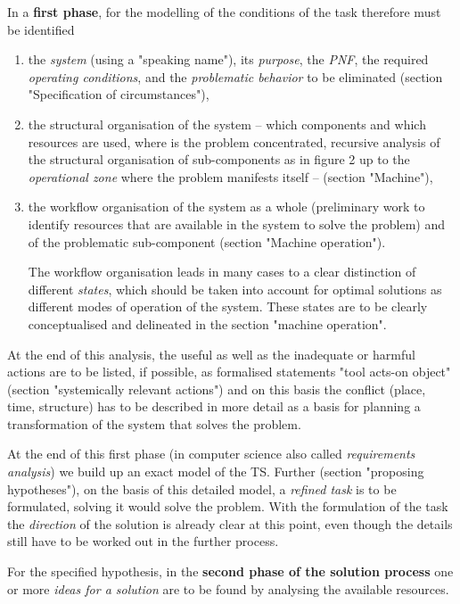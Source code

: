 \documentclass[11pt,a4paper]{article}
\begin{document}
In a \textbf{first phase}, for the modelling of the conditions of the task
therefore must be identified
\begin{enumerate}[noitemsep]
\item the \emph{system} (using a "speaking name"), its \emph{purpose}, the
  \emph{PNF}, the required \emph{operating conditions}, and the
  \emph{problematic behavior} to be eliminated (section "Specification of
  circumstances"), 
\item the structural organisation of the system -- which components and which
  resources are used, where is the problem concentrated, recursive analysis of
  the structural organisation of sub-components as in figure 2 up to the
  \emph{operational zone} where the problem manifests itself -- (section
  "Machine"),
\item the workflow organisation of the system as a whole (preliminary work to
  identify resources that are available in the system to solve the problem)
  and of the problematic sub-component (section "Machine operation").
  
  The workflow organisation leads in many cases to a clear distinction of
  different \emph{states}, which should be taken into account for optimal
  solutions as different modes of operation of the system.  These states are
  to be clearly conceptualised and delineated in the section "machine
  operation".
\end{enumerate}

At the end of this analysis, the useful as well as the inadequate or harmful
actions are to be listed, if possible, as formalised statements "tool acts-on
object" (section "systemically relevant actions") and on this basis the
conflict (place, time, structure) has to be described in more detail as a
basis for planning a transformation of the system that solves the problem.

At the end of this first phase (in computer science also called
\emph{requirements analysis}) we build up an exact model of the TS.  Further
(section "proposing hypotheses"), on the basis of this detailed model, a
\emph{refined task} is to be formulated, solving it would solve the problem.
With the formulation of the task the \emph{direction} of the solution is
already clear at this point, even though the details still have to be worked
out in the further process.

For the specified hypothesis, in the \textbf{second phase of the solution
  process} one or more \emph{ideas for a solution} are to be found by
analysing the available resources. 
\end{document}
